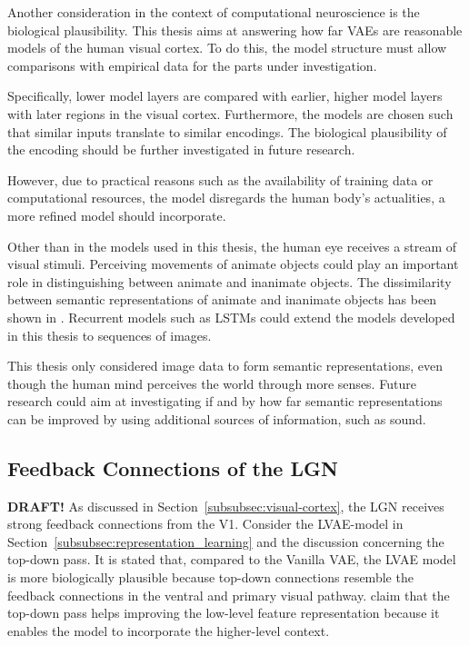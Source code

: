 Another consideration in the context of computational neuroscience is the biological plausibility.
This thesis aims at answering how far \acp{VAE} are reasonable models of the human visual cortex.
To do this, the model structure must allow comparisons with empirical data for the parts under investigation.

Specifically, lower model layers are compared with earlier, higher model layers with later regions in the visual cortex.
Furthermore, the models are chosen such that similar inputs translate to similar encodings.
The biological plausibility of the encoding should be further investigated in future research.

However, due to practical reasons such as the availability of training data or computational resources, the model disregards the human body's actualities, a more refined model should incorporate.

Other than in the models used in this thesis, the human eye receives a stream of visual stimuli.
Perceiving movements of animate objects could play an important role in distinguishing between animate and inanimate objects.
The dissimilarity between semantic representations of animate and inanimate objects has been shown in \citet{khaligh2014deep}.
Recurrent models such as LSTMs could extend the models developed in this thesis to sequences of images.

This thesis only considered image data to form semantic representations, even though the human mind perceives the world through more senses.
Future research could aim at investigating if and by how far semantic representations can be improved by using additional sources of information, such as sound.

\subsection{Feedback Connections of the \acl{LGN}}\label{subsec:feedback-connections-of-the-lateral-geniculate-nucleus}
\textbf{DRAFT!}
As discussed in Section~\ref{subsubsec:visual-cortex}, the \ac{LGN} receives strong feedback connections from the \ac{V1}.
Consider the \ac{LVAE}-model in Section~\ref{subsubsec:representation_learning} and the discussion concerning the top-down pass.
It is stated that, compared to the Vanilla VAE, the \ac{LVAE} model is more biologically plausible because top-down connections resemble the feedback connections in the ventral and primary visual pathway.
\citet{sonderby2016ladder} claim that the top-down pass helps improving the low-level feature representation because it enables the model to incorporate the higher-level context.

